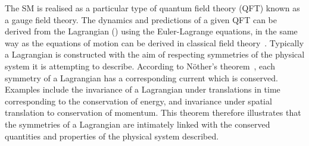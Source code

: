 The SM is realised as a particular type of quantum field theory (QFT) known as a gauge field theory.
The dynamics and predictions of a given QFT can be derived from the Lagrangian (\Like)
using the Euler-Lagrange equations, 
in the same way as the equations of motion can be derived in classical field theory~\cite{Peskin}.
Typically a Lagrangian is constructed with the aim of respecting symmetries of the physical system
it is attempting to describe.
According to N\"other's theorem~\cite{Nother}, 
each symmetry of a Lagrangian has a corresponding current which is conserved.
Examples include the invariance of a Lagrangian under translations in time 
corresponding to the conservation of energy, 
and invariance under spatial translation to conservation of momentum.
This theorem therefore illustrates that the symmetries of a Lagrangian 
are intimately linked with the conserved quantities and properties of the physical system described.

